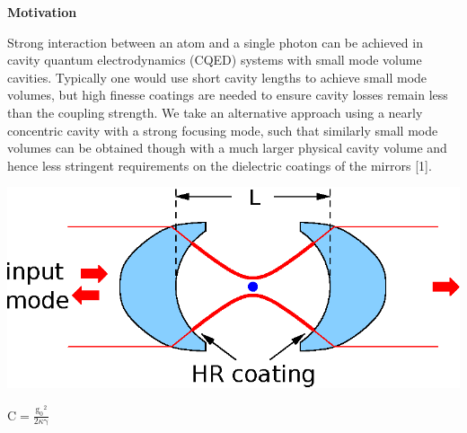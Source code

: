 \documentclass[portrait,a0,final]{a0poster} %
\makeatletter
\newenvironment{figurehere}
  {\def\@captype{figure}}
  {}
\newenvironment{poster}{
  \begin{center}
  \begin{minipage}[c]{0.98\textwidth}
}{
  \end{minipage}
  \end{center}
}
\makeatother
\begin{document}
\begin{poster}
\vspace{0.2cm}



\vspace{1cm}
\begin{multicols}{2}
\setlength{\parskip}{1ex plus 0.5ex minus 0.2ex}

      \begin{center}
          \begin{center}{\bf \Large \textsf {Motivation}}\end{center}
      \end{center}

      Strong interaction between an atom and a single photon can be achieved in
      cavity quantum electrodynamics (CQED) systems with small mode volume cavities.
      Typically one would use short cavity lengths to achieve small mode volumes, but high
      finesse coatings are needed to ensure cavity losses remain less than the coupling strength.
      We take an alternative approach using a nearly concentric cavity with a strong focusing mode, such that
      similarly small mode volumes can be obtained though with a much larger physical cavity volume
      and hence less stringent requirements on the dielectric coatings of the mirrors [1].

\begin{figurehere}
	\begin{multicols}{2}
        \begin{center}
            \includegraphics[width=\columnwidth]{cavitything.eps}

            \larger[2.5]

 	$ {\mathrm{C}= \frac{\mathrm{g_0}^{2}}{2\kappa\mathrm{\gamma}}}
            $   
       
    \columnbreak



\end{center}
\end{multicols}
\end{figurehere}
\end{multicols}
\end{poster}
\end{document}
